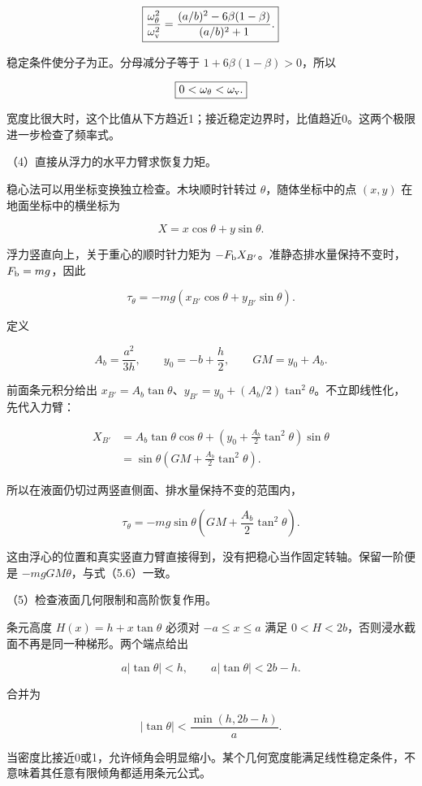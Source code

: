 \documentclass[12pt,a4paper,fontset=fandol]{ctexart}
\begin{document}
\[
\boxed{\frac{\omega_\theta^2}{\omega_{\rm v}^2}
=\frac{(a/b)^2-6\beta(1-\beta)}{(a/b)^2+1}.}
\]

稳定条件使分子为正。分母减分子等于 \(1+6\beta(1-\beta)>0\)，所以

\[
\boxed{0<\omega_\theta<\omega_{\rm v}.}
\]

宽度比很大时，这个比值从下方趋近1；接近稳定边界时，比值趋近0。这两个极限进一步检查了频率式。

（4）直接从浮力的水平力臂求恢复力矩。

稳心法可以用坐标变换独立检查。木块顺时针转过 \(\theta\)，随体坐标中的点
\((x,y)\) 在地面坐标中的横坐标为

\[
X=x\cos\theta+y\sin\theta.
\]

浮力竖直向上，关于重心的顺时针力矩为
\(-F_{\rm b}X_{B'}\)。准静态排水量保持不变时，\(F_{\rm b}=mg\)，因此

\[
\tau_\theta=-mg(x_{B'}\cos\theta+y_{B'}\sin\theta).
\]

定义

\[
A_b=\frac{a^2}{3h},\qquad y_0=-b+\frac h2,\qquad
GM=y_0+A_b.
\]

前面条元积分给出
\(x_{B'}=A_b\tan\theta\)、\(y_{B'}=y_0+(A_b/2)\tan^2\theta\)。不立即线性化，先代入力臂：

\[
\begin{aligned}
X_{B'}
&=A_b\tan\theta\cos\theta
+\left(y_0+\frac{A_b}{2}\tan^2\theta\right)\sin\theta\\
&=\sin\theta\left(GM+\frac{A_b}{2}\tan^2\theta\right).
\end{aligned}
\]

所以在液面仍切过两竖直侧面、排水量保持不变的范围内，

\[
\tau_\theta=-mg\sin\theta
\left(GM+\frac{A_b}{2}\tan^2\theta\right).
\]

这由浮心的位置和真实竖直力臂直接得到，没有把稳心当作固定转轴。保留一阶便是
\(-mgGM\theta\)，与式（5.6）一致。

（5）检查液面几何限制和高阶恢复作用。

条元高度 \(H(x)=h+x\tan\theta\) 必须对 \(-a\le x\le a\) 满足
\(0<H<2b\)，否则浸水截面不再是同一种梯形。两个端点给出

\[
a|\tan\theta|<h,\qquad
a|\tan\theta|<2b-h.
\]

合并为

\[
|\tan\theta|<\frac{\min(h,2b-h)}a.
\]

当密度比接近0或1，允许倾角会明显缩小。某个几何宽度能满足线性稳定条件，不意味着其任意有限倾角都适用条元公式。
\end{document}
